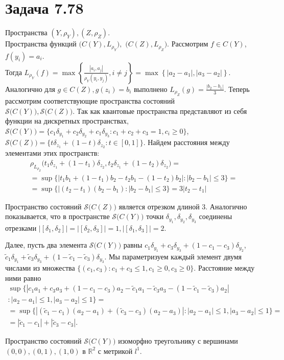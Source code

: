 \documentclass[a4paper,12pt]{article}
\date{\today}
\begin{document}
\section{Задача 7.78}
Пространства $ (Y,\rho_Y),(Z,\rho_Z) $. \\Пространства функций 
$ \big(C(Y),L_{\rho_Y}\big), $  $\big(C(Z),L_{\rho_Z}\big) $. Рассмотрим $ f\in C(Y) $, $ f(y_i)=a_i $.\\
Тогда $ L_{\rho_Y}(f) = \max\left\{\frac{|a_i,a_j|}{\rho_Y(y_i,y_j)},i\neq j\right\} = \max\left\{|a_2-a_1|,|a_3-a_2|\right\}$.\\
Аналогично для $ g\in C(Z), g(z_i) = b_i $ выполнено $ L_{\rho_Z}(g) = \frac{|b_2-b_1|}{3} .$
Теперь рассмотрим соответствующие пространства состояний\\ $ \mathcal{S}\big(C(Y)\big) ,\mathcal{S}\big(C(Z)\big)$. Так как квантовые пространства представляют из себя функции на дискретных пространствах, $ \mathcal{S}\big(C(Y)\big) = \{c_1 \delta_{y_1} + c_2 \delta_{y_2} + c_1 \delta_{y_3} \colon c_1+c_2+c_3=1, c_i\ge 0\}$,
$ \mathcal{S}\big(C(Z)\big) = \{t \delta_{z_1} + (1-t) \delta_{z_2}\colon t \in [0,1]\}$. Найдем расстояния между элементами этих пространств:
\begin{multline*}
  \rho_{L_{\rho_Z}}\big(t_1\delta_{z_1} + (1-t_1)\delta_{z_2},t_2\delta_{z_1} + (1-t_2)\delta_{z_2}\big) =\\
  = \sup\big\{|t_1b_1 + (1-t_1)b_2 - t_2b_1 - (1-t_2)b_2| \colon |b_2-b_1|\le 3\big\}=\\
  = \sup\big\{|(t_2-t_1)(b_2-b_1)\colon |b_2-b_1|\le 3\big\}=3|t_2-t_1|
\end{multline*}

Пространство состояний $ \mathcal{S}\big(C(Z)\big) $ является отрезком длиной $ 3 $. Аналогично показывается, что в пространстве $ \mathcal{S}\big(C(Y)\big) $ точки $ \delta_{y_1},\delta_{y_2},\delta_{y_3} $ соединены отрезками $ \big|\left[\delta_1,\delta_2\right]\big|=\big|\left[\delta_2,\delta_3\right]\big|=1,\big|\left[\delta_1,\delta_3\right]\big|=2 .$

Далее, пусть два элемента $ \mathcal{S}\big(C(Y)\big)$ равны $ c_1 \delta_{y_1} + c_3 \delta_{y_3}  + (1-c_1 - c_3)\delta_{y_2} $, $ \widetilde{c}_1 \delta_{y_1} + \widetilde{c}_3 \delta_{y_3}  + (1-\widetilde{c}_1 - \widetilde{c}_3)\delta_{y_3} $. Мы параметризуем каждый элемент двумя числами из множества $\{(c_1,c_3) \colon c_1 + c_3 \le 1, c_1\ge 0, c_3 \ge 0\}$. Расстояние между ними равно 
\begin{multline*}
  \sup\big\{|c_1 a_1 + c_3a_3+(1-c_1-c_3)a_2 - \widetilde{c}_1a_1-\widetilde{c}_3a_3 - (1-\widetilde{c}_1-\widetilde{c}_3)a_2|\\ \colon |a_2-a_1|\le1, |a_3-a_2|\le 1\big\} = \\
 = \sup\big\{|(\widetilde{c}_1 - c_1)(a_2-a_1) + (\widetilde{c}_3-c_3)(a_2-a_3)| \colon|a_2-a_1|\le1, |a_3-a_2|\le 1 \big\} =\\
  = |\widetilde{c}_1-c_1 |+| \widetilde{c}_3 - c_3|.
\end{multline*}  

Пространство состояний $ \mathcal{S}\big(C(Y)\big) $ изоморфно треугольнику с вершинами $(0,0),(0,1),(1,0)$ в $ \mathbb{R}^2 $ с метрикой $ l^1 $.
\end{document}
